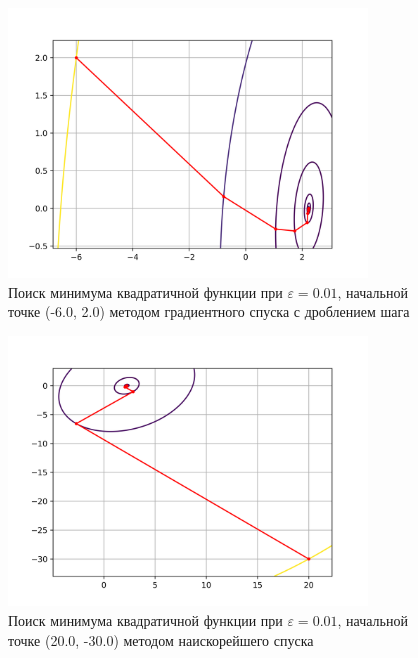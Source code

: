             \begin{figure}[H]
	        \centering
	        \includegraphics[width=0.85\textwidth]{Метод градиентного спуска с дробным шагом, eps 0.01, start = (-6.00, 2.00), Квадратичная функция}%
	        \caption{Поиск минимума квадратичной функции при $\varepsilon = 0.01$, начальной точке (-6.0, 2.0) методом градиентного спуска с дроблением шага}
	        \vspace*{-1.2cm}
            \end{figure}
            
            \begin{figure}[H]
	        \centering
	        \includegraphics[width=0.85\textwidth]{Метод наискорейшего спуска, eps 0.01, start = (20.00, -30.00), Квадратичная функция}%
	        \caption{Поиск минимума квадратичной функции при $\varepsilon = 0.01$, начальной точке (20.0, -30.0) методом наискорейшего спуска}
	        \vspace*{-1.2cm}
            \end{figure}
            
